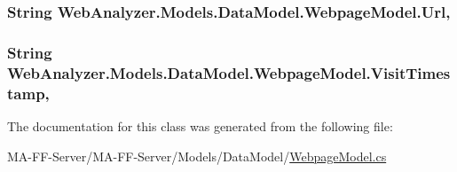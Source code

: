 \subsubsection[{Url}]{\setlength{\rightskip}{0pt plus 5cm}String Web\+Analyzer.\+Models.\+Data\+Model.\+Webpage\+Model.\+Url\hspace{0.3cm}{\ttfamily [get]}, {\ttfamily [set]}}\label{class_web_analyzer_1_1_models_1_1_data_model_1_1_webpage_model_a956b067ed12f422f646b7e2a4b6bb42d}
\hypertarget{class_web_analyzer_1_1_models_1_1_data_model_1_1_webpage_model_ac3378fdc78273706547ec3a9d377ef9a}{}
\subsubsection[{Visit\+Timestamp}]{\setlength{\rightskip}{0pt plus 5cm}String Web\+Analyzer.\+Models.\+Data\+Model.\+Webpage\+Model.\+Visit\+Timestamp\hspace{0.3cm}{\ttfamily [get]}, {\ttfamily [set]}}\label{class_web_analyzer_1_1_models_1_1_data_model_1_1_webpage_model_ac3378fdc78273706547ec3a9d377ef9a}


The documentation for this class was generated from the following file\+:\begin{DoxyCompactItemize}
\item 
M\+A-\/\+F\+F-\/\+Server/\+M\+A-\/\+F\+F-\/\+Server/\+Models/\+Data\+Model/\hyperlink{_webpage_model_8cs}{Webpage\+Model.\+cs}\end{DoxyCompactItemize}
